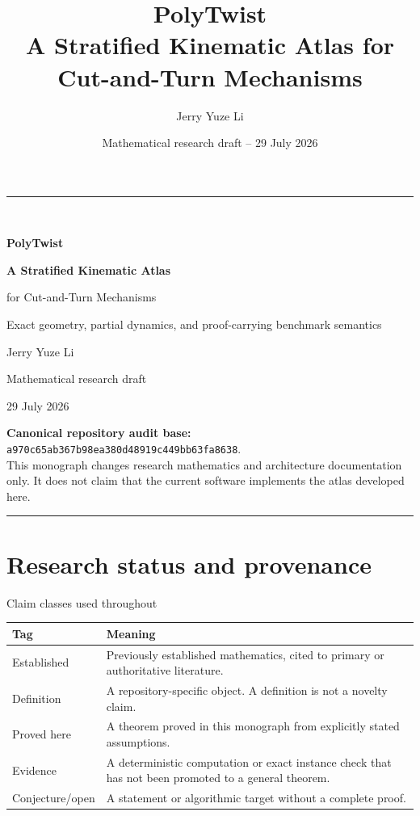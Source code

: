 \documentclass[11pt,openany]{book}
\title{\Huge\bfseries PolyTwist\\[0.4em]
\LARGE A Stratified Kinematic Atlas for Cut-and-Turn Mechanisms}
\author{Jerry Yuze Li}
\date{Mathematical research draft -- 29 July 2026}
\theoremstyle{polyplain}
\theoremstyle{polydef}
\begin{document}
\frontmatter
\begin{titlepage}
\centering
\vspace*{1.0in}
{\color{polyblue}\rule{0.85\textwidth}{1.2pt}}\\[1.1cm]
{\Huge\bfseries PolyTwist\par}
\vspace{0.35cm}
{\LARGE\bfseries A Stratified Kinematic Atlas\par}
\vspace{0.12cm}
{\LARGE for Cut-and-Turn Mechanisms\par}
\vspace{0.8cm}
{\large Exact geometry, partial dynamics, and proof-carrying benchmark semantics\par}
\vfill
{\Large Jerry Yuze Li\par}
\vspace{0.25cm}
{\large Mathematical research draft\par}
{\large 29 July 2026\par}
\vfill
\begin{minipage}{0.82\textwidth}
\small
\textbf{Canonical repository audit base:}
\texttt{a970c65ab367b98ea380d48919c449bb63fa8638}.\\[0.35em]
This monograph changes research mathematics and architecture documentation only. It does not claim that the current software implements the atlas developed here.
\end{minipage}
\vspace{0.8cm}
{\color{polyblue}\rule{0.85\textwidth}{1.2pt}}
\end{titlepage}

\chapter*{Research status and provenance}

\begin{statusbox}{Claim classes used throughout}
\begin{tabularx}{\textwidth}{L{0.19\textwidth}Y}
\toprule
\textbf{Tag} & \textbf{Meaning}\\
\midrule
Established & Previously established mathematics, cited to primary or authoritative literature.\\
Definition & A repository-specific object. A definition is not a novelty claim.\\
Proved here & A theorem proved in this monograph from explicitly stated assumptions.\\
Evidence & A deterministic computation or exact instance check that has not been promoted to a general theorem.\\
Conjecture/open & A statement or algorithmic target without a complete proof.\\
\bottomrule
\end{tabularx}
\end{statusbox}
\end{document}

